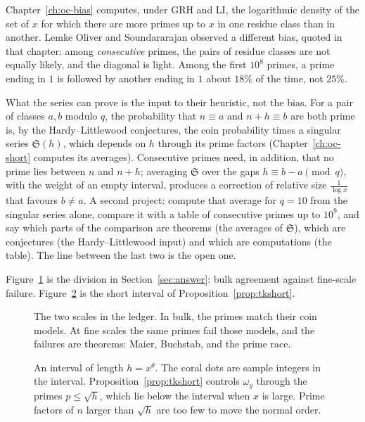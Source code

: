 Chapter~\ref{ch:oc-bias} computes, under GRH and LI, the logarithmic density of the set of $x$ for which there are more primes up to $x$ in one residue class than in another. Lemke Oliver and Soundararajan observed a different bias, quoted in that chapter: among \emph{consecutive} primes, the pairs of residue classes are not equally likely, and the diagonal is light. Among the first $10^8$ primes, a prime ending in $1$ is followed by another ending in $1$ about $18\%$ of the time, not $25\%$.

What the series can prove is the input to their heuristic, not the bias. For a pair of classes $a,b$ modulo $q$, the probability that $n\equiv a$ and $n+h\equiv b$ are both prime is, by the Hardy--Littlewood conjectures, the coin probability times a singular series $\mathfrak S(h)$, which depends on $h$ through its prime factors (Chapter~\ref{ch:oc-short} computes its averages). Consecutive primes need, in addition, that no prime lies between $n$ and $n+h$; averaging $\mathfrak S$ over the gaps $h\equiv b-a\pmod q$, with the weight of an empty interval, produces a correction of relative size $\frac1{\log x}$ that favours $b\ne a$. A second project: compute that average for $q=10$ from the singular series alone, compare it with a table of consecutive primes up to $10^9$, and say which parts of the comparison are theorems (the averages of $\mathfrak S$), which are conjectures (the Hardy--Littlewood input) and which are computations (the table). The line between the last two is the open one.

Figure~\ref{fig:v15c14-ledger} is the division in Section~\ref{sec:answer}: bulk agreement against fine-scale failure. Figure~\ref{fig:v15c14-interval} is the short interval of Proposition~\ref{prop:tkshort}.

\begin{figure}[ht]
\centering
{}
\caption{The two scales in the ledger. In bulk, the primes match their coin models. At fine scales the same primes fail those models, and the failures are theorems: Maier, Buchstab, and the prime race.}
\label{fig:v15c14-ledger}
\end{figure}

\begin{figure}[ht]
\centering
{}
\caption{An interval of length \(h=x^{\theta}\). The coral dots are sample integers in the interval. Proposition~\ref{prop:tkshort} controls \(\omega_y\) through the primes \(p\le\sqrt h\), which lie below the interval when \(x\) is large. Prime factors of \(n\) larger than \(\sqrt h\) are too few to move the normal order.}
\label{fig:v15c14-interval}
\end{figure}


